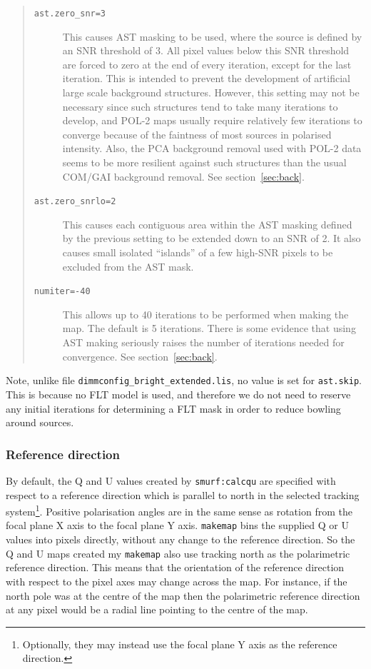 \documentclass[twoside,11pt]{starlink}
\begin{document}
\begin{quote}
\begin{description}

\item[\texttt{ast.zero\_snr=3}] This causes AST masking to be used,
where the source is defined by an SNR threshold of 3. All pixel values
below this SNR threshold are forced to zero at the end of every iteration,
except for the last iteration. This is intended to prevent the development
of artificial large scale background structures. However, this setting may
not be necessary since such structures tend to take many iterations to
develop, and POL-2 maps usually require relatively few iterations to
converge because of the faintness of most sources in polarised intensity.
Also, the PCA background removal used with POL-2 data seems to be more
resilient against such structures than the usual COM/GAI background
removal. See section~\ref{sec:back}.

\item[\texttt{ast.zero\_snrlo=2}] This causes each contiguous area within
the AST masking defined by the previous setting to be extended down to
an SNR of 2. It also causes small isolated ``islands'' of a few high-SNR
pixels to be excluded from the AST mask.

\item[\texttt{numiter=-40}] This allows up to 40 iterations to be
performed when making the map. The default is 5 iterations. There is some
evidence that using AST making seriously raises the number of iterations
needed for convergence.  See section~\ref{sec:back}.

\end{description}
\end{quote}

Note, unlike file \texttt{dimmconfig\_bright\_extended.lis}, no value is
set for \texttt{ast.skip}. This is because no FLT model is used, and
therefore we do not need to reserve any initial iterations for determining
a FLT mask in order to reduce bowling around sources.


\subsubsection{Reference direction}
By default, the Q and U values created by \texttt{smurf:calcqu} are
specified with respect to a reference direction which is parallel to
north in the selected tracking system\footnote{Optionally, they may
instead use the focal plane Y axis as the reference direction.}.
Positive polarisation angles are in the same sense as rotation from the
focal plane X axis to the focal plane Y axis. \texttt{makemap} bins the
supplied Q or U values into pixels directly, without any change to the
reference direction. So the Q and U maps created my \texttt{makemap} also
use tracking north as the polarimetric reference direction. This means
that the orientation of the reference direction with respect to the pixel axes
may change across the map. For instance, if the north pole was at the
centre of the map then the polarimetric reference direction at any pixel
would be a radial line pointing to the centre of the map.
\end{document}
